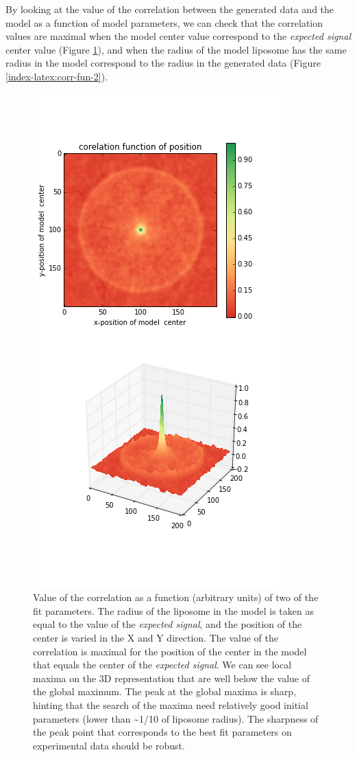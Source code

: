 \documentclass[A4paperpaper,11pt,english]{sphinxmanual}
\begin{document}
By looking at the value of the correlation between the generated data and the model
as a function of model parameters, we can check that the correlation
values are maximal when the model center value correspond to the \emph{expected signal}
center value (Figure \ref{index-latex:corr-fun-1}), and when the radius of the model liposome
has the same radius in the model correspond to the radius in the generated data (Figure \ref{index-latex:corr-fun-2}).
\begin{figure}[htbp]
\centering
\capstart

\includegraphics[width=0.500\linewidth]{double-c-_100-by-100-rc-40_0-noise-0_5-delta-4_0_.png}
\caption{Value of the correlation as a function (arbitrary units) of two of the fit
parameters. The radius of the liposome in the model is taken as
equal to the value of the \emph{expected signal}, and the position of the center is
varied in the X and Y direction. The value of the correlation is maximal for
the position of the center in the model that equals the center of the \emph{expected signal}.  We
can see local maxima on the 3D representation that are well below the value
of the global maximum. The peak at the global maxima is sharp, hinting that
the search of the maxima need relatively good initial
parameters (lower than \textasciitilde{}1/10 of liposome radius). The sharpness of the peak
point that corresponds to the best fit parameters on experimental data should be
robust.}\label{index-latex:corr-fun-1}\end{figure}
\end{document}
